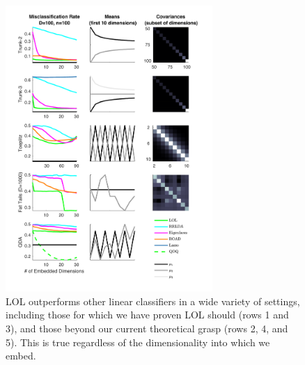 \documentclass[simplex.tex]{subfiles}
\begin{document}
\begin{figure}[h!]
\begin{cframed}
\centering
\includegraphics[width=0.7\textwidth]{../../figs/plot_all.pdf}
\caption{
LOL outperforms other linear classifiers in a wide variety of settings, including those for which we have proven LOL should (rows 1 and 3), and those beyond our current theoretical grasp (rows 2, 4, and 5). This is true regardless of the dimensionality into which we embed.
}
\label{fig:LOL}
\end{cframed}
\end{figure}
\end{document}
